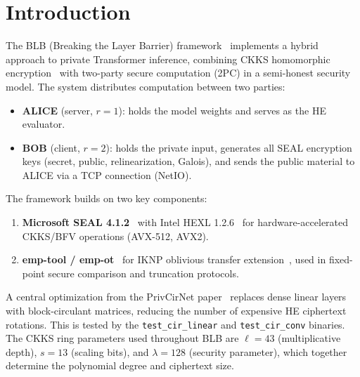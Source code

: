 \section{Introduction}\label{sec:introduction}

The BLB (Breaking the Layer Barrier) framework~\cite{xu2025breaking} implements a hybrid approach to private Transformer inference, combining CKKS homomorphic encryption~\cite{cheon2017ckks} with two-party secure computation (2PC) in a semi-honest security model.
The system distributes computation between two parties:
\begin{itemize}[nosep]
  \item \textbf{ALICE} (server, $r{=}1$): holds the model weights and serves as the HE evaluator.
  \item \textbf{BOB} (client, $r{=}2$): holds the private input, generates all SEAL encryption keys (secret, public, relinearization, Galois), and sends the public material to ALICE via a TCP connection (NetIO).
\end{itemize}

The framework builds on two key components:
\begin{enumerate}[nosep]
  \item \textbf{Microsoft SEAL 4.1.2}~\cite{seal2024} with Intel HEXL 1.2.6~\cite{hexl2023} for hardware-accelerated CKKS/BFV operations (AVX-512, AVX2).
  \item \textbf{emp-tool / emp-ot}~\cite{emptoolkit} for IKNP oblivious transfer extension~\cite{iknp2003}, used in fixed-point secure comparison and truncation protocols.
\end{enumerate}

A central optimization from the PrivCirNet paper~\cite{xu2024privcirnet} replaces dense linear layers with block-circulant matrices, reducing the number of expensive HE ciphertext rotations.
This is tested by the \texttt{test\_cir\_linear} and \texttt{test\_cir\_conv} binaries.
The CKKS ring parameters used throughout BLB are $\ell{=}43$ (multiplicative depth), $s{=}13$ (scaling bits), and $\lambda{=}128$ (security parameter), which together determine the polynomial degree and ciphertext size.


